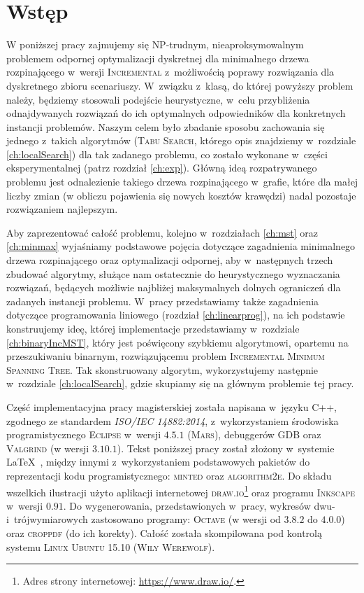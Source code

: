 \chapter{Wstęp}
\thispagestyle{chapterBeginStyle}





W poniższej pracy zajmujemy się \textsc{NP}-trudnym, nieaproksymowalnym~\cite[twierdzenie $6$]{Kasperski2014} problemem odpornej optymalizacji dyskretnej dla minimalnego drzewa rozpinającego w~wersji \textsc{Incremental} z~możliwością poprawy rozwiązania dla dyskretnego zbioru scenariuszy.
W~związku z~klasą, do której powyższy problem należy, będziemy stosowali podejście heurystyczne, w~celu przybliżenia odnajdywanych rozwiązań do ich optymalnych odpowiedników dla konkretnych instancji problemów.
Naszym celem było zbadanie sposobu zachowania się jednego z~takich algorytmów (\textsc{Tabu Search}, którego opis znajdziemy w~rozdziale \ref{ch:localSearch}) dla tak zadanego problemu, co zostało wykonane w~części eksperymentalnej (patrz rozdział \ref{ch:exp}).
Główną ideą rozpatrywanego problemu jest odnalezienie takiego drzewa rozpinającego w~grafie, które dla małej liczby zmian (w obliczu pojawienia się nowych kosztów krawędzi) nadal pozostaje rozwiązaniem najlepszym. 

Aby zaprezentować całość problemu, kolejno w~rozdziałach \ref{ch:mst} oraz \ref{ch:minmax} wyjaśniamy podstawowe pojęcia dotyczące zagadnienia minimalnego drzewa rozpinającego oraz optymalizacji odpornej, aby w~następnych trzech zbudować algorytmy, służące nam ostatecznie do heurystycznego wyznaczania rozwiązań, będących możliwie najbliżej maksymalnych dolnych ograniczeń dla zadanych instancji problemu.
W~pracy przedstawiamy także zagadnienia dotyczące programowania liniowego (rozdział \ref{ch:linearprog}), na ich podstawie konstruujemy ideę, której implementacje przedstawiamy w~rozdziale \ref{ch:binaryIncMST}, który jest poświęcony szybkiemu algorytmowi, opartemu na przeszukiwaniu binarnym, rozwiązującemu problem \textsc{Incremental Minimum Spanning Tree}.
Tak skonstruowany algorytm, wykorzystujemy następnie w~rozdziale \ref{ch:localSearch}, gdzie skupiamy się na głównym problemie tej pracy.

Część implementacyjna pracy magisterskiej została napisana w~języku \textsf{C++}, zgodnego ze standardem \textit{\textsc{ISO/IEC 14882:2014}}, z~wykorzystaniem środowiska programistycznego \textsc{Eclipse} w~wersji \textsc{$4.5.1$} (\textsc{Mars}), debuggerów \textsc{GDB} oraz \textsc{Valgrind} (w wersji \textsc{$3.10.1$}).
Tekst poniższej pracy został złożony w~systemie \LaTeX~, między innymi z~wykorzystaniem podstawowych pakietów do reprezentacji kodu programistycznego: \textsc{minted} oraz \textsc{algorithm2e}.
Do składu wszelkich ilustracji użyto aplikacji internetowej \textsc{draw.io}\footnote{
	Adres strony internetowej: \url{https://www.draw.io/}.
} oraz programu \textsc{Inkscape} w~wersji \textsc{$0.91$}.
Do wygenerowania, przedstawionych w~pracy, wykresów dwu- i~trójwymiarowych zastosowano programy: \textsc{Octave} (w wersji od \textsc{$3.8.2$} do \textsc{$4.0.0$}) oraz \textsc{croppdf} (do ich korekty).
Całość została skompilowana pod kontrolą systemu \textsc{Linux Ubuntu 15.10 (Wily Werewolf)}.